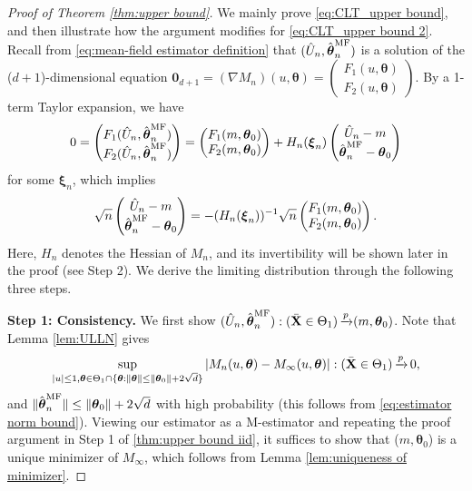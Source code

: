 \documentclass[preprint,reqno]{imsart}
\newcommand{\ttheta}{\boldsymbol{\theta}}
\DeclareMathOperator{\xp}{\xrightarrow{\mathnormal p}}
\newcommand{\X}{\mathbf{X}}
\newcommand{\xxi}{\boldsymbol \xi}
\newcommand{\thetamf}{\hat{\boldsymbol \theta}^{\text{MF}}_{\mathnormal n}}
\begin{document}
\begin{appendix}
\begin{proof}[Proof of Theorem \ref{thm:upper bound}]
    We mainly prove \eqref{eq:CLT_upper bound}, and then illustrate how the argument modifies for \eqref{eq:CLT_upper bound 2}. Recall from \eqref{eq:mean-field estimator definition} that $(\hat{U}_n, \thetamf)$ is a solution of the ($d+1$)-dimensional equation $\mathbf{0}_{d+1} = (\nabla M_n)(u, \ttheta) = \begin{pmatrix} F_1(u, \ttheta) \\ F_2(u, \ttheta) \end{pmatrix}$. 
    By a 1-term Taylor expansion, we have
    \begin{equation}\label{eq:taylor low tmp clt}
        0 =\begin{pmatrix} F_1(\hat{U}_n,\thetamf)  \\ 
    F_2(\hat{U}_n,\thetamf) \end{pmatrix} = \begin{pmatrix}  F_1(m, \ttheta_0) \\ F_2(m, \ttheta_0) \end{pmatrix} + H_n (\xxi_n) \begin{pmatrix} \hat{U}_n - m \\ \thetamf - \ttheta_0 \end{pmatrix}
    \end{equation}
    for some $\xxi_n$, which implies
    \begin{align}\label{eq:mf estimator expansion}
        \sqrt{n} \begin{pmatrix} \hat{U}_n - m \\ \thetamf - \ttheta_0 \end{pmatrix} = - (H_n(\xxi_n))^{-1} \sqrt{n} \begin{pmatrix} F_1(m, \ttheta_0) \\ F_2(m, \ttheta_0) \end{pmatrix}.
    \end{align}
    Here, $H_n$ denotes the Hessian of $M_n$, and its invertibility will be shown later in the proof (see Step 2). We derive the limiting distribution through the following three steps.
    
    \textbf{Step 1: Consistency.} We first show $(\hat{U}_n, \thetamf) : (\bar{\X} \in \Theta_1) \xp (m, \ttheta_0)$.
    Note that Lemma \ref{lem:ULLN} gives $$\sup_{|u| \le 1, \ttheta\in\Theta_1 \cap \{\ttheta: \|\ttheta\| \le \|\ttheta_0\| + 2\sqrt{d} \}} |M_n(u,\ttheta) - M_{\infty}(u,\ttheta)| : (\bar{\X} \in \Theta_1) \xp 0,$$ 
    and $\|\thetamf\| \le \|\ttheta_0\| + 2\sqrt{d}$ with high probability (this follows from \eqref{eq:estimator norm bound}).
    Viewing our estimator as a M-estimator and repeating the proof argument in Step 1 of \cref{thm:upper bound iid}, it suffices to show that ($m, \ttheta_0$) is a unique minimizer of $M_{\infty}$, which follows from Lemma \ref{lem:uniqueness of minimizer}. %


\end{proof}
\end{appendix}
\end{document}
